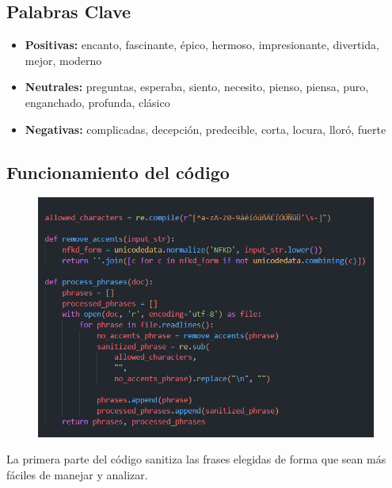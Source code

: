 \documentclass{article}
\begin{document}
    \subsection{Palabras Clave}
    \begin{itemize}
        \item \textbf{Positivas:} encanto, fascinante, épico, hermoso, impresionante, divertida, mejor, moderno
        \item \textbf{Neutrales:}  preguntas, esperaba, siento, necesito, pienso, piensa, puro, enganchado, profunda, clásico
        \item \textbf{Negativas:} complicadas, decepción, predecible, corta, locura, lloró, fuerte

    \end{itemize}

    \subsection{Funcionamiento del código}
    \begin{figure}[H]
        \centering
        \includegraphics[width=1\linewidth]{assets/Codigo1}
    \end{figure}
    La primera parte del código sanitiza las frases elegidas de forma que sean más fáciles de manejar y analizar.\\
\end{document}
